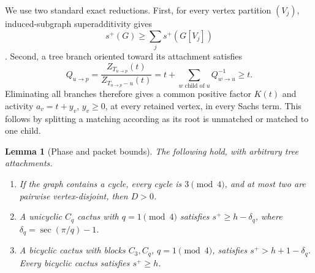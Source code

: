 \documentclass[11pt]{article}
\newtheorem{lemma}[theorem]{Lemma}
\begin{document}
We use two standard exact reductions.  First, for every vertex partition
$(V_j)$, induced-subgraph superadditivity gives
\begin{equation}\label{eq:super}
 s^+(G)\geq\sum_j s^+(G[V_j])
\end{equation}
\cite{AKMP}.  Second, a tree branch oriented toward its attachment satisfies
\begin{equation}\label{eq:BP}
 Q_{u\to p}=\frac{Z_{T_{u\to p}}(t)}{Z_{T_{u\to p}-u}(t)}
 =t+\sum_{w\text{ child of }u}Q_{w\to u}^{-1}\geq t.
\end{equation}
Eliminating all branches therefore gives a common positive factor $K(t)$ and
activity $a_v=t+y_v$, $y_v\geq0$, at every retained vertex, in every Sachs
term.  This follows by splitting a matching according as its root is unmatched
or matched to one child.

\begin{lemma}[Phase and packet bounds]\label{lem:packets}
The following hold, with arbitrary tree attachments.
\begin{enumerate}
\item If the graph contains a cycle, every cycle is $3\pmod4$, and at most two are pairwise
vertex-disjoint, then $D>0$.
\item A unicyclic $C_q$ cactus with $q=1\pmod4$ satisfies
$s^+\geq h-\delta_q$, where $\delta_q=\sec(\pi/q)-1$.
\item A bicyclic cactus with blocks $C_3,C_q$, $q=1\pmod4$, satisfies
$s^+>h+1-\delta_q$.  Every bicyclic cactus satisfies $s^+\geq h$.
\end{enumerate}
\end{lemma}
\end{document}

